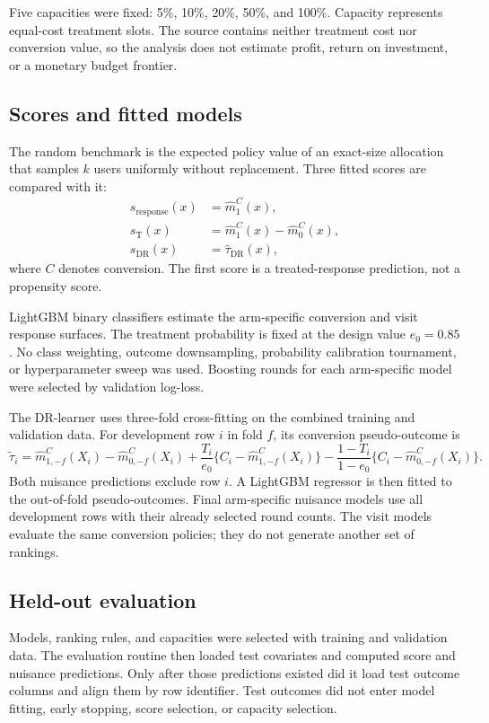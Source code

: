 \documentclass[11pt]{article}
\begin{document}
Five capacities were fixed: 5\%, 10\%, 20\%, 50\%, and 100\%. Capacity represents equal-cost treatment slots. The source contains neither treatment cost nor conversion value, so the analysis does not estimate profit, return on investment, or a monetary budget frontier.

\subsection{Scores and fitted models}

The random benchmark is the expected policy value of an exact-size allocation that samples $k$ users uniformly without replacement. Three fitted scores are compared with it:
\[
\begin{aligned}
s_{\mathrm{response}}(x) &= \widehat m_1^C(x),\\
s_{\mathrm{T}}(x) &= \widehat m_1^C(x)-\widehat m_0^C(x),\\
s_{\mathrm{DR}}(x) &= \widehat\tau_{\mathrm{DR}}(x),
\end{aligned}
\]
where $C$ denotes conversion. The first score is a treated-response prediction, not a propensity score.

LightGBM binary classifiers estimate the arm-specific conversion and visit response surfaces. The treatment probability is fixed at the design value $e_0=0.85$. No class weighting, outcome downsampling, probability calibration tournament, or hyperparameter sweep was used. Boosting rounds for each arm-specific model were selected by validation log-loss.

The DR-learner uses three-fold cross-fitting on the combined training and validation data. For development row $i$ in fold $f$, its conversion pseudo-outcome is
\[
\widetilde{\tau}_i =
\widehat m^C_{1,-f}(X_i)-\widehat m^C_{0,-f}(X_i)
+\frac{T_i}{e_0}\{C_i-\widehat m^C_{1,-f}(X_i)\}
-\frac{1-T_i}{1-e_0}\{C_i-\widehat m^C_{0,-f}(X_i)\}.
\]
Both nuisance predictions exclude row $i$. A LightGBM regressor is then fitted to the out-of-fold pseudo-outcomes. Final arm-specific nuisance models use all development rows with their already selected round counts. The visit models evaluate the same conversion policies; they do not generate another set of rankings.

\subsection{Held-out evaluation}

Models, ranking rules, and capacities were selected with training and validation data. The evaluation routine then loaded test covariates and computed score and nuisance predictions. Only after those predictions existed did it load test outcome columns and align them by row identifier. Test outcomes did not enter model fitting, early stopping, score selection, or capacity selection.
\end{document}
